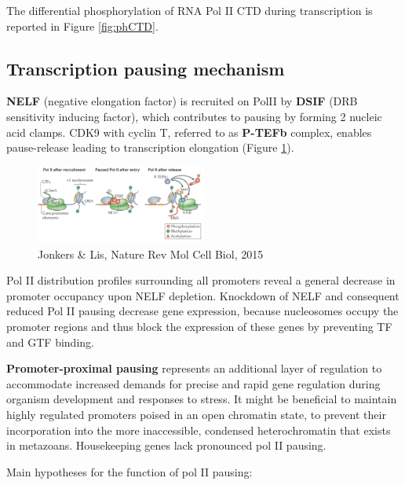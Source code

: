 The differential phosphorylation of RNA Pol II CTD during transcription is reported in Figure \ref{fig:phCTD}.

\hypertarget{transcription-pausing-mechanism}{%
\subsection{Transcription pausing mechanism}\label{transcription-pausing-mechanism}}

\textbf{NELF} (negative elongation factor) is recruited on PolII by \textbf{DSIF} (DRB sensitivity inducing factor), which contributes to pausing by forming 2 nucleic acid clamps. CDK9 with cyclin T, referred to as \textbf{P-TEFb} complex, enables pause-release leading to transcription elongation (Figure \ref{fig:dsif}).

\begin{figure}
\centering
\includegraphics[width=0.5\textwidth]{../_resources/Screenshot_2022-09-22_at_22-14-15.png}
\caption{Jonkers \& Lis, Nature Rev Mol Cell Biol, 2015}
\label{fig:dsif}
\end{figure}

Pol II distribution profiles surrounding all promoters reveal a general decrease in promoter occupancy upon NELF depletion. Knockdown of NELF and consequent reduced Pol II pausing decrease gene expression, because nucleosomes occupy the promoter regions and thus block the expression of these genes by preventing TF and GTF binding.

\textbf{Promoter-proximal pausing} represents an additional layer of regulation to accommodate increased demands for precise and rapid gene regulation during organism development and responses to stress. It might be beneficial to maintain highly regulated promoters poised in an open chromatin state, to prevent their incorporation into the more inaccessible, condensed heterochromatin that exists in metazoans. Housekeeping genes lack pronounced pol II pausing.

Main hypotheses for the function of pol II pausing:

